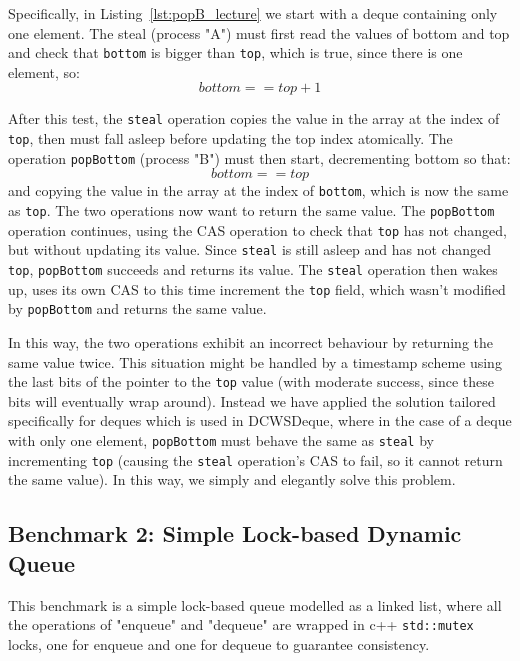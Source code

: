 \documentclass [10pt]{scrartcl}
\begin{document}
   
   Specifically, in Listing~\ref{lst:popB_lecture} we start with a deque containing only one element. The steal (process "A") must first read the values of bottom and top and check that \texttt{bottom} is bigger than \texttt{top}, which is true, since there is one element, so:
   \begin{equation}
   bottom == top + 1    
   \end{equation}
   
   After this test, the \texttt{steal} operation copies the value in the array at the index of \texttt{top}, then must fall asleep before updating the top index atomically. The operation \texttt{popBottom} (process "B") must then start, decrementing bottom so that:
   \begin{equation}
   bottom == top   
   \end{equation}
   and copying the value in the array at the index of \texttt{bottom}, which is now the same as \texttt{top}. The two operations now want to return the same value. 
   The \texttt{popBottom} operation continues, using the CAS operation to check that \texttt{top} has not changed, but without updating its value. Since \texttt{steal} is still asleep and has not changed \texttt{top}, \texttt{popBottom} succeeds and returns its value. The \texttt{steal} operation then wakes up, uses its own CAS to this time increment the \texttt{top} field, which wasn't modified by \texttt{popBottom} and returns the same value.
   
   In this way, the two operations exhibit an incorrect behaviour by returning the same value twice. This situation might be handled by a timestamp scheme using the last bits of the pointer to the \texttt{top} value (with moderate success, since these bits will eventually wrap around). Instead we have applied the solution tailored specifically for deques which is used in DCWSDeque, where in the case of a deque with only one element, \texttt{popBottom} must behave the same as \texttt{steal} by incrementing \texttt{top} (causing the \texttt{steal} operation's CAS to fail, so it cannot return the same value). In this way, we simply and elegantly solve this problem. %
   
   
   \subsection{Benchmark 2: Simple Lock-based Dynamic Queue}
   This benchmark is a simple lock-based queue modelled as a linked list, where all the operations of "enqueue" and "dequeue" are wrapped in c++ \texttt{std::mutex} locks,
   one for enqueue and one for dequeue to guarantee consistency.
   
\end{document}
